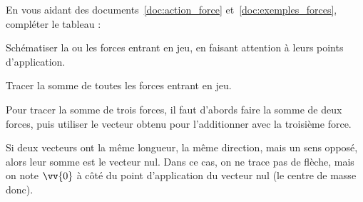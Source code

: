 \mesure 
En vous aidant des documents~\ref{doc:action_force} et~\ref{doc:exemples_forces}, compléter le tableau :
\begin{listePoints}
  \item Schématiser la ou les forces entrant en jeu, en faisant attention à leurs points d'application.
  \item Tracer la somme de toutes les forces entrant en jeu.
\end{listePoints}

\attention Pour tracer la somme de trois forces, il faut d'abords faire la somme de deux forces, puis utiliser le vecteur obtenu pour l'additionner avec la troisième force.

\attention Si deux vecteurs ont la même longueur, la même direction, mais un sens opposé, alors leur somme est le vecteur nul. Dans ce cas, on ne trace pas de flèche, mais on note $\vv{0}$ à côté du point d'application du vecteur nul (le centre de masse donc).
